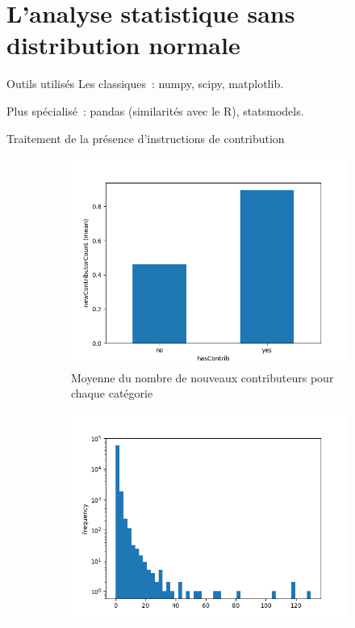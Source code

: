 \documentclass[usenames,dvipsnames,10pt]{beamer}
\begin{document}
\section{L'analyse statistique sans distribution normale}

\begin{frame}{Outils utilisés}
    Les classiques : numpy, scipy, matplotlib.

    Plus spécialisé : pandas (similarités avec le R), statsmodels.

\end{frame}

\begin{frame}{Traitement de la présence d'instructions de contribution}
    \begin{figure}
        \begin{subfigure}[t]{0.45\textwidth}
            \includegraphics[width=\textwidth]{../experiment/data_analysis/hasContrib_meanNewContributorCount.png}
            \caption{Moyenne du nombre de nouveaux contributeurs pour chaque catégorie}
        \end{subfigure}
        \begin{subfigure}[t]{0.45\textwidth}
            \includegraphics[width=\textwidth]{../experiment/data_analysis/newContributorCount_distribution.png}

\end{subfigure}
\end{figure}
\end{frame}
\end{document}

